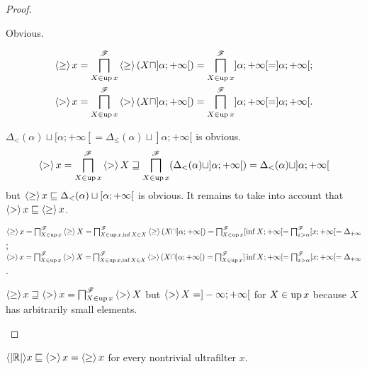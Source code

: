 \begin{proof}
~
\begin{widedisorder}
\item[\ref{g-uf-v-triv}] Obvious.
\item[\ref{g-uf-v-right}]
  \begin{gather*}
  \left\langle \geq\right\rangle x = \bigsqcap^{\mathscr{F}}_{X \in \operatorname{up} x} \left\langle \geq\right\rangle (X \sqcap] \alpha ; + \infty [) =
  \bigsqcap^{\mathscr{F}}_{X \in \operatorname{up} x}] \alpha ; + \infty [=] \alpha ; + \infty [; \\
  \left\langle >\right\rangle x = \bigsqcap^{\mathscr{F}}_{X \in \operatorname{up} x} \left\langle >\right\rangle (X \sqcap] \alpha ; + \infty [) =
  \bigsqcap^{\mathscr{F}}_{X \in \operatorname{up} x}] \alpha ; + \infty [=] \alpha ; + \infty [.
  \end{gather*}
\item[\ref{g-uf-v-left}] $\Delta_{<} (\alpha) \sqcup [\alpha ; + \infty [=
  \Delta_{\leq} (\alpha) \sqcup] \alpha ; + \infty [$ is obvious.
  \[ \left\langle >\right\rangle x = \bigsqcap^{\mathscr{F}}_{X \in \operatorname{up} x} \left\langle >\right\rangle X \sqsupseteq \bigsqcap^{\mathscr{F}}_{X \in \operatorname{up} x} (\Delta_{<}
  (\alpha) \sqcup] \alpha ; + \infty [) = \Delta_{<} (\alpha) \sqcup] \alpha ; +
  \infty [ \]
  but $\left\langle \geq\right\rangle x \sqsubseteq \Delta_{<} (\alpha) \sqcup
  [\alpha ; + \infty [$ is obvious. It remains to take into account that
  $\left\langle >\right\rangle x \sqsubseteq \left\langle \geq\right\rangle x$.
\item[\ref{g-uf-v-posinf}] $\left\langle \geq\right\rangle x = \bigsqcap^{\mathscr{F}}_{X \in \operatorname{up} x} \left\langle \geq\right\rangle X =
  \bigsqcap^{\mathscr{F}}_{X \in \operatorname{up} x, \inf X \in X}
  \left\langle \geq\right\rangle (X \sqcap] \alpha ; + \infty [) =
  \bigsqcap^{\mathscr{F}}_{X \in \operatorname{up} x} [\inf X ; + \infty [=
  \bigsqcap^{\mathscr{F}}_{x > \alpha} [x ; + \infty [= \Delta_{+ \infty}$;
  $\left\langle >\right\rangle x = \bigsqcap^{\mathscr{F}}_{X \in \operatorname{up} x} \left\langle >\right\rangle X =
  \bigsqcap^{\mathscr{F}}_{X \in \operatorname{up} x, \inf X \in X}
  \left\langle >\right\rangle (X \sqcap] \alpha ; + \infty [) =
  \bigsqcap^{\mathscr{F}}_{X \in \operatorname{up} x} ]\inf X ; + \infty [=
  \bigsqcap^{\mathscr{F}}_{x > \alpha} [x ; + \infty [= \Delta_{+ \infty}$.
\item[\ref{g-uf-v-neginf}] $\left\langle \geq\right\rangle x \sqsupseteq \left\langle >\right\rangle x =
  \bigsqcap^{\mathscr{F}}_{X \in \operatorname{up} x} \left\langle >\right\rangle X$ but $\left\langle >\right\rangle X =] - \infty ; + \infty [$ for $X \in \operatorname{up} x$
  because $X$ has arbitrarily small elements.
\end{widedisorder}
\end{proof}

\begin{lem}
$\langle \lvert \mathbb{R} \rvert \rangle x \sqsubseteq \left\langle >\right\rangle x = \left\langle \geq\right\rangle x$ for every nontrivial ultrafilter $x$.
\end{lem}

